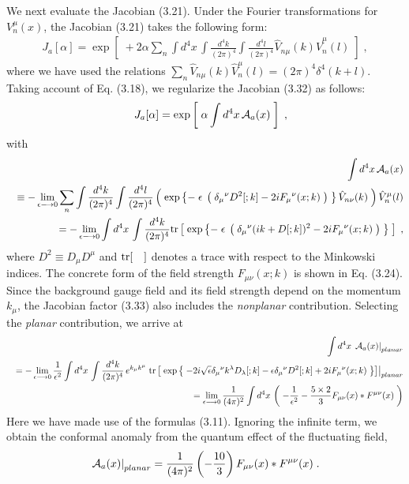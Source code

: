 \documentclass[a4paper,12pt]{article}
\begin{document}
We next evaluate the Jacobian (3.21). Under the Fourier transformations for 
$V_{n}^{\mu}(x)$, the Jacobian (3.21) takes the following form: 
%
%
\begin{eqnarray}
J_{a}[\alpha] = \exp \left[\; 
+2\alpha \sum_{n} \int d^{4}x \, 
\int\frac{d^{4}k}{(2\pi)^{4}} \int\frac{d^{4}l}{(2\pi)^{4}}
\hat{V}_{n\mu}(k)  \hat{V}_{n}^{\mu}(l)  \; \right]  \;,
\end{eqnarray}
%
where we have used the relations 
$\sum_{n}\hat{V}_{n\mu}(k)\hat{V}_{n}^{\mu}(l) = (2\pi)^{4}
\delta^{4}(k+l)$. Taking account of Eq. (3.18), we regularize the Jacobian 
(3.32) as follows: 
%
%
\begin{eqnarray}
& & J_{a}[\alpha] = \exp \left[\; \alpha \int d^{4}x \, {\cal A}_{a}(x) 
\; \right] \;, \nonumber 
\end{eqnarray}
%
%
with 
%
%
\begin{eqnarray}
& & \int d^{4}x \, {\cal A}_{a}(x) \nonumber \\
& & \equiv -\lim_{\epsilon \longrightarrow 0} 
\sum_{n} \int\frac{d^{4}k}{(2\pi)^{4}} \int\frac{d^{4}l}{(2\pi)^{4}}
\left( \;\exp\left\{-\; \epsilon\; \left(\; 
\delta_{\mu}{}^{\nu}D^{2}[;k] -2iF_{\mu}{}^{\nu}(x ;k) \;\right) \;\right\}
\hat{V}_{n \nu}(k) \; \right) \hat{V}_{n}^{\mu}(l) \nonumber \\ 
& & = -\lim_{\epsilon \longrightarrow 0} \int d^{4}x \, 
\int\frac{d^{4}k}{(2\pi)^{4}} 
{\rm tr} \left[\; \exp\left\{-\; \epsilon\; \left(\; 
\delta_{\mu}{}^{\nu}(ik + D[;k])^{2} 
-2iF_{\mu}{}^{\nu}(x; k) \;\right) \;\right\} \; \right] \;,
\end{eqnarray}
%
where $D^{2} \equiv D_{\mu}D^{\mu}$ and ${\rm tr}[ \quad ]$ denotes a trace 
with respect to the Minkowski indices. The concrete form of the field strength 
$F_{\mu\nu}(x; k)$ is shown in Eq. (3.24). Since the background gauge field 
and its field strength depend on the momentum $k_{\mu}$, the Jacobian factor 
(3.33) also includes the {\it nonplanar} contribution. Selecting the 
{\it planar} contribution, we arrive at 
%
%
\begin{eqnarray}
& & \int d^{4}x \, \left. {\cal A}_{a}(x) \right|_{planar} \nonumber \\
& & = -\lim_{\epsilon \longrightarrow 0} \frac{1}{\epsilon^{2}}
\int d^{4}x \, \int \frac{d^{4}k}{(2\pi)^{4}} \,e^{k_{\mu}k^{\mu}} 
\left. {\rm tr} \left[\; \exp \left\{ \; 
-2i\sqrt{\epsilon}\delta_{\mu}{}^{\nu} k^{\lambda} D_{\lambda}[;k] 
- \epsilon \delta_{\mu}{}^{\nu}D^{2}[;k] 
+ 2i F_{\mu}{}^{\nu}(x; k) \; \right\} \right] \right|_{planar} 
\nonumber \\ 
& & = \lim_{\epsilon \longrightarrow 0} \frac{1}{(4\pi)^{2}} 
\int d^{4}x \, \left( \; -\frac{1}{\epsilon^{2}} 
 - \frac{5 \times 2}{3}F_{\mu\nu}(x) \ast F^{\mu\nu}(x) \;\right) 
\end{eqnarray}
%
Here we have made use of the formulas (3.11). Ignoring the infinite term, we 
obtain the conformal anomaly from the quantum effect of the fluctuating 
field, 
%
\begin{eqnarray}
\left. {\cal A}_{a}(x) \right|_{planar} =  
\frac{1}{(4\pi)^{2}}  \left( -\frac{10}{3} \right) 
F_{\mu\nu}(x) \ast F^{\mu\nu}(x) \;.
\end{eqnarray}
%
\end{document}
